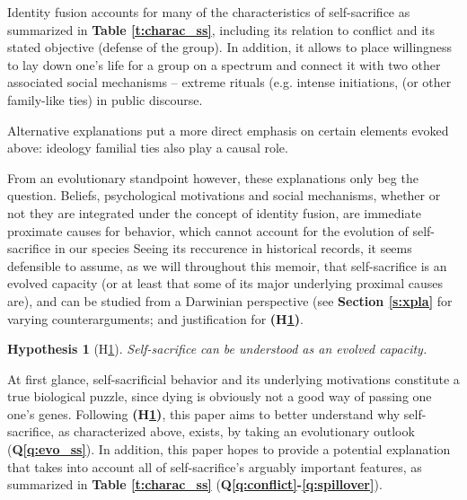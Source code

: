 \documentclass[a4paper,12pt]{report}
\newtheorem{hyp}{Hypothesis}
\begin{document}
Identity fusion accounts for many of the characteristics of self-sacrifice as 
summarized in \textbf{Table \ref{t:charac_ss}},
including its relation to conflict and its stated objective (defense of the group).
In addition, it allows to place willingness to lay down one’s life for a group on a
spectrum and connect it with two other associated social mechanisms – extreme rituals
(e.g. intense initiations, %
(or other family-like ties) in public discourse.

Alternative explanations put a more direct emphasis on certain elements evoked above:
ideology %
familial ties %
also play a causal role.


From an evolutionary standpoint however, these explanations only beg the question.
Beliefs, psychological motivations and social mechanisms, whether or not they are
integrated under the concept of identity fusion, are immediate proximate causes for behavior,
which cannot account for the evolution of self-sacrifice in our species %
Seeing its reccurence in historical records, it seems defensible to assume, as we will
throughout this memoir, that self-sacrifice is an evolved capacity
(or at least that some of its major underlying proximal causes are), and
can be studied from a Darwinian perspective (see \textbf{Section \ref{s:xpla}} for
varying counterarguments; and justification for \textbf{(H\ref{h:evo})}.

\begin{hyp}[H\ref{h:evo}]
    \label{h:evo}
    Self-sacrifice can be understood as an evolved capacity.
\end{hyp}

At first glance, self-sacrificial behavior and its underlying motivations constitute
a true biological puzzle, since dying is obviously not a good way of passing one one’s genes.
Following \textbf{(H\ref{h:evo})}, this paper aims to better understand why self-sacrifice, 
as characterized above, exists, by taking an evolutionary outlook (\textbf{Q\ref{q:evo_ss}}).
In addition, this paper hopes to provide a potential explanation that takes into
account all of self-sacrifice's arguably important features, as summarized
in \textbf{Table \ref{t:charac_ss}} (\textbf{Q\ref{q:conflict}-\ref{q:spillover}}).
\end{document}
